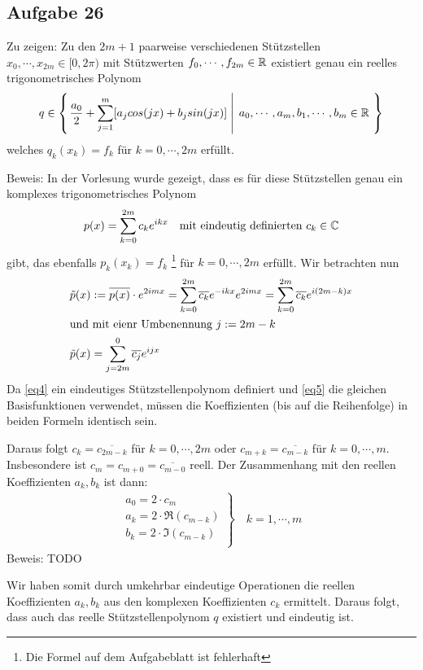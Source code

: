 \subsection*{Aufgabe 26}
Zu zeigen: Zu den $2 m + 1 $ paarweise verschiedenen Stützstellen $x_0 , \cdots , x_{2m} \in [0, 2\pi)$ mit
Stützwerten $f_0 , \cdots , f_{2m} \in \mathbb R$ existiert genau ein reelles trigonometrisches
Polynom
\begin{align}
  q \in \left\lbrace \left. \frac{a_0}{2} + \sum_{j = 1}^m [a_j cos(j x) + b_j sin(j x)] \;
    \right| \; a_0 , \cdots , a_m , b_1 , \cdots , b_m \in \mathbb R\  \right\rbrace
\end{align}
welches $q_k(x_k) = f_k$ für $k = 0 , \cdots , 2m$ erfüllt.

Beweis: In der Vorlesung wurde gezeigt, dass es für diese Stützstellen genau ein
komplexes trigonometrisches Polynom
\begin{align}
\label{eq4}
  p(x) = \sum_{k = 0}^{2m} c_k e^{i k x}\quad \text{mit eindeutig definierten }c_k \in \mathbb C
\end{align}
gibt, das ebenfalls $p_k(x_k) = f_k$ \footnote{Die Formel auf dem Aufgabeblatt ist fehlerhaft}
für $k = 0 , \cdots , 2m$ erfüllt. Wir betrachten nun
\begin{align}
\nonumber
  \tilde{p}(x) &:= \overline{p(x)} \cdot e^{2 i m x } =
    \sum_{k = 0}^{2m} \overline{c_k} e^{- i k x} e^{2 i m x } =
    \sum_{k = 0}^{2m} \overline{c_k} e^{ i (2m - k) x } \\
\intertext{und mit eienr Umbenennung $j := 2 m - k$}
\label{eq5}
  \tilde{p}(x) &= \sum_{j = 2m}^0 \overline{c_j} e^{ i j x }
\end{align}
Da \eqref{eq4} ein eindeutiges Stützstellenpolynom definiert und \eqref{eq5} die gleichen
Basisfunktionen verwendet, müssen die Koeffizienten (bis auf die Reihenfolge) in beiden
Formeln identisch sein.

Daraus folgt $c_k = \overline{c_{2 m -k}}$ für $k = 0 , \cdots , 2m$ oder
$c_{m + k} = \overline{c_{m - k}}$ für $k = 0 , \cdots , m$. Insbesondere ist
$c_m = c_{m + 0} = \overline{c_{m - 0}}$ reell. Der Zusammenhang mit
den reellen Koeffizienten $a_k, b_k$ ist dann:
\begin{align}
\boxed{
\left.
\begin{array}{l}
a_0 = 2 \cdot c_m \\
a_k = 2 \cdot \Re(c_{m - k})\\
b_k = 2 \cdot \Im(c_{m - k})\\
\end{array}
\right\rbrace \quad k = 1 , \cdots , m
}
\end{align}
Beweis: TODO

Wir haben somit durch umkehrbar eindeutige Operationen die reellen Koeffizienten
$a_k, b_k$ aus den komplexen Koeffizienten $c_k$ ermittelt. Daraus folgt, dass auch
das reelle Stützstellenpolynom $q$ existiert und eindeutig ist.







